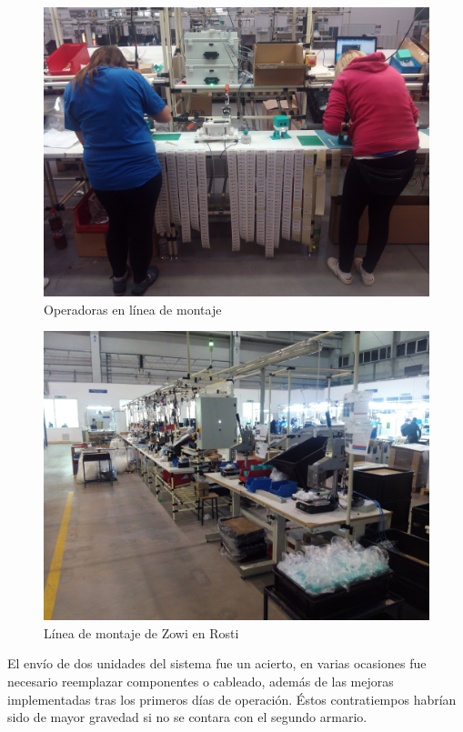 \begin{figure}
\centering
\includegraphics[width=135mm]{Figures/conc2.jpg}
\caption[Operadoras en línea de montaje]{Operadoras en línea de montaje}
\label{fig:conc2}
\end{figure}

\begin{figure}
\centering
\includegraphics[width=135mm]{Figures/conc3.jpg}
\caption[Línea de montaje de Zowi en Rosti]{Línea de montaje de Zowi en Rosti}
\label{fig:conc3}
\end{figure}

El envío de dos unidades del sistema fue un acierto, en varias ocasiones fue necesario reemplazar componentes o cableado, además de las mejoras implementadas tras los primeros días de operación. Éstos contratiempos habrían sido de mayor gravedad si no se contara con el segundo armario.

